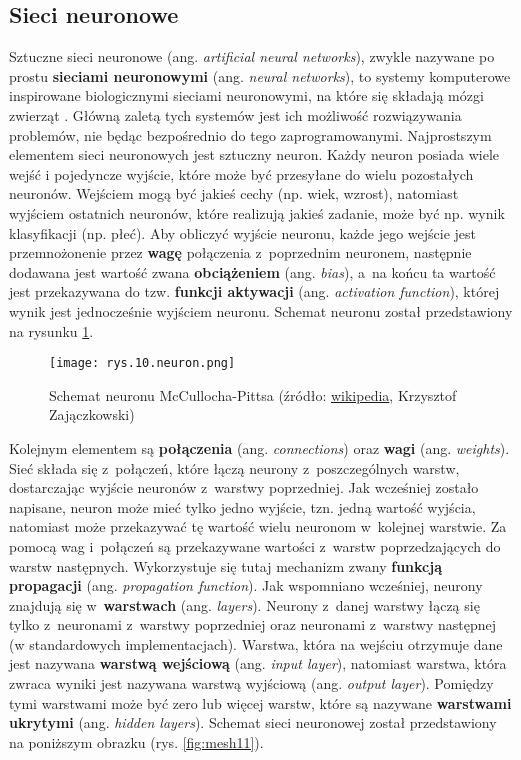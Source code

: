 
\subsection{Sieci neuronowe}
\label{cha:Siecineuronowe}

Sztuczne sieci neuronowe (ang. \textit{artificial neural networks}), zwykle nazywane po prostu \textbf{sieciami neuronowymi} (ang. \textit{neural networks}), to systemy komputerowe inspirowane biologicznymi sieciami neuronowymi, na które się składają mózgi zwierząt \cite{Tadeusiewicz15}. Główną zaletą tych systemów jest ich możliwość rozwiązywania problemów, nie będąc bezpośrednio do tego zaprogramowanymi. Najprostszym elementem sieci neuronowych jest sztuczny neuron. Każdy neuron posiada wiele wejść i pojedyncze wyjście, które może być przesyłane do wielu pozostałych neuronów. Wejściem mogą być jakieś cechy (np. wiek, wzrost), natomiast wyjściem ostatnich neuronów, które realizują jakieś zadanie, może być np. wynik klasyfikacji (np. płeć). Aby obliczyć wyjście neuronu, każde jego wejście jest przemnożonenie przez \textbf{wagę} połączenia z~poprzednim neuronem, następnie dodawana jest wartość zwana \textbf{obciążeniem} (ang. \textit{bias}), a~na końcu ta wartość jest przekazywana do tzw. \textbf{funkcji aktywacji} (ang. \textit{activation function}), której wynik jest jednocześnie wyjściem neuronu. Schemat neuronu został przedstawiony na rysunku \ref{fig:mesh10}.
\begin{figure}[h]
    \centering
    \texttt{[image: rys.10.neuron.png]}
    \caption{Schemat neuronu McCullocha-Pittsa (źródło: \protect\href{https://pl.wikipedia.org/wiki/Neuron_McCullocha-Pittsa}{wikipedia}, Krzysztof Zajączkowski)}
    \label{fig:mesh10}
\end{figure}
Kolejnym elementem są \textbf{połączenia} (ang. \textit{connections}) oraz \textbf{wagi} (ang. \textit{weights}). Sieć składa się z~połączeń, które łączą neurony z~poszczególnych warstw, dostarczając wyjście neuronów z~warstwy poprzedniej. Jak wcześniej zostało napisane, neuron może mieć tylko jedno wyjście, tzn. jedną wartość wyjścia, natomiast może przekazywać tę wartość wielu neuronom w~kolejnej warstwie. Za pomocą wag i~połączeń są przekazywane wartości z~warstw poprzedzających do warstw następnych. Wykorzystuje się tutaj mechanizm zwany \textbf{funkcją propagacji} (ang. \textit{propagation function}). Jak wspomniano wcześniej, neurony znajdują się w~\textbf{warstwach} (ang. \textit{layers}). Neurony z~danej warstwy łączą się tylko z~neuronami z~warstwy poprzedniej oraz neuronami z~warstwy następnej (w standardowych implementacjach). Warstwa, która na wejściu otrzymuje dane jest nazywana \textbf{warstwą wejściową} (ang. \textit{input layer}), natomiast warstwa, która zwraca wyniki jest nazywana warstwą wyjściową (ang. \textit{output layer}). Pomiędzy tymi warstwami może być zero lub więcej warstw, które są nazywane \textbf{warstwami ukrytymi} (ang. \textit{hidden layers}). Schemat sieci neuronowej został przedstawiony na poniższym obrazku (rys. \ref{fig:mesh11}). 
